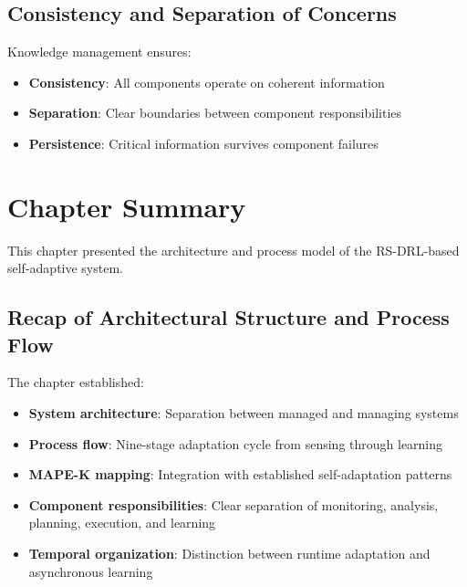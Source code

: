 \documentclass[11pt,a4paper]{article}
\begin{document}
\subsection{Consistency and Separation of Concerns}

Knowledge management ensures:

\begin{itemize}
    \item \textbf{Consistency}: All components operate on coherent information
    \item \textbf{Separation}: Clear boundaries between component responsibilities
    \item \textbf{Persistence}: Critical information survives component failures
\end{itemize}


\section{Chapter Summary}
\label{sec:summary}

This chapter presented the architecture and process model of the RS-DRL-based self-adaptive system.

\subsection{Recap of Architectural Structure and Process Flow}

The chapter established:

\begin{itemize}
    \item \textbf{System architecture}: Separation between managed and managing systems
    \item \textbf{Process flow}: Nine-stage adaptation cycle from sensing through learning
    \item \textbf{MAPE-K mapping}: Integration with established self-adaptation patterns
    \item \textbf{Component responsibilities}: Clear separation of monitoring, analysis, planning, execution, and learning
    \item \textbf{Temporal organization}: Distinction between runtime adaptation and asynchronous learning
\end{itemize}
\end{document}
